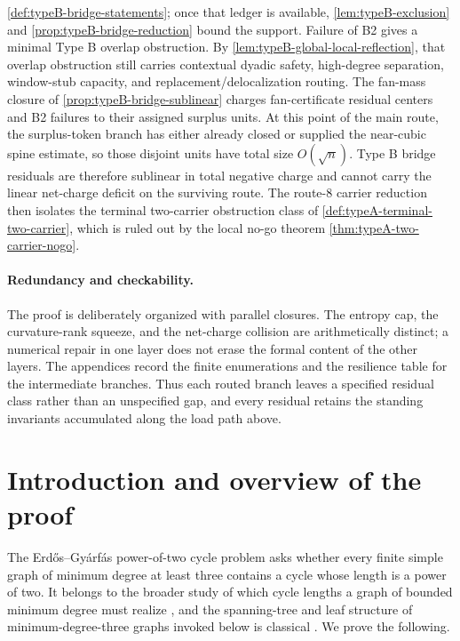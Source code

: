 \documentclass[11pt]{article}
\begin{document}
\cref{def:typeB-bridge-statements}; once that ledger is available,
\cref{lem:typeB-exclusion} and \cref{prop:typeB-bridge-reduction} bound the
support.  Failure of B2 gives a minimal Type B overlap obstruction.  By
\cref{lem:typeB-global-local-reflection}, that overlap obstruction still carries
contextual dyadic safety, high-degree separation, window-stub capacity, and
replacement/delocalization routing.  The fan-mass closure of
\cref{prop:typeB-bridge-sublinear} charges fan-certificate residual centers and
B2 failures to their assigned surplus units.  At this point of the main route,
the surplus-token branch has either already closed or supplied the near-cubic
spine estimate, so those disjoint units have total size \(O(\sqrt n)\).  Type B
bridge residuals are therefore sublinear in total negative charge and cannot
carry the linear net-charge deficit on the surviving route.  The route-8 carrier
reduction then isolates the terminal two-carrier obstruction class of
\cref{def:typeA-terminal-two-carrier}, which is ruled out by the local no-go
theorem \cref{thm:typeA-two-carrier-nogo}.

\paragraph{Redundancy and checkability.}
The proof is deliberately organized with parallel closures.  The entropy cap,
the curvature-rank squeeze, and the net-charge collision are arithmetically
distinct; a numerical repair in one layer does not erase the formal content of
the other layers.  The appendices record the finite enumerations and the
resilience table for the intermediate branches.  Thus each routed branch leaves
a specified residual class rather than an unspecified gap, and every residual
retains the standing invariants accumulated along the load path above.


\section{Introduction and overview of the proof}\label{sec:intro}

The Erd\H{o}s--Gy\'arf\'as power-of-two cycle problem asks whether every finite simple graph of minimum degree at least three contains a cycle whose length is a power of two.  It belongs to the broader study of which cycle lengths a graph of bounded minimum degree must realize \cite{BondyVince,GaoMa}, and the spanning-tree and leaf structure of minimum-degree-three graphs invoked below is classical \cite{KleitmanWest}.  We prove the following.
\end{document}
